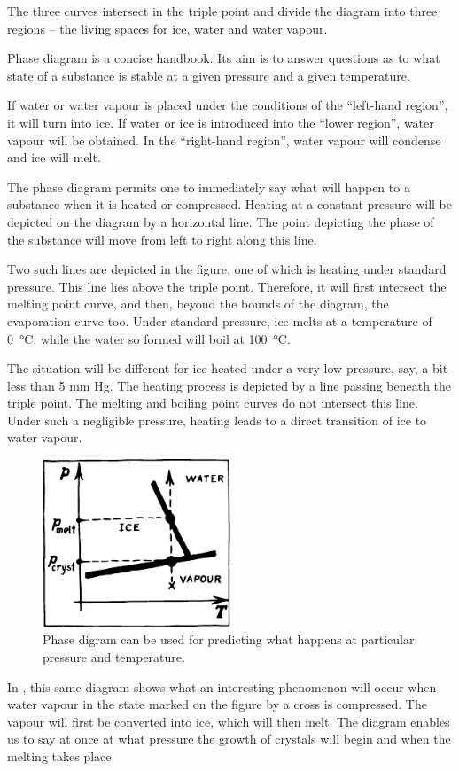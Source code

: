 The three curves intersect in the triple point and divide the diagram into three regions -- the living spaces for ice, water and water vapour.

Phase diagram is a concise handbook. Its aim is to answer questions as to what state of a substance is stable at a given pressure and a given temperature.

If water or water vapour is placed under the conditions of the ``left-hand region'', it will turn into ice. If water or ice is introduced into the ``lower region'', water vapour will be obtained. In the ``right-hand region'', water va­pour will condense and ice will melt.

The phase diagram permits one to immediately say what will happen to a substance when it is heated or compressed. Heating at a constant pressure will be depicted on the diagram by a horizontal line. The point depicting the phase of the substance will move from left to right along this line.

Two such lines are depicted in the figure, one of which is heating under standard pressure. This line lies above the triple point. Therefore, it will first intersect the melting point curve, and then, beyond the bounds of the diagram, the evaporation curve too. Under standard pressure, ice melts at a temperature of \SI{0}{\celsius}, while the water so formed will boil at \SI{100}{\celsius}.

The situation will be different for ice heated under a very low pressure, say, a bit less than 5 mm Hg. The heating process is depicted by a line passing beneath the triple point. The melting and boiling point curves do not intersect this line. Under such a negligible pressure, heating leads to a direct transition of ice to water vapour.

\begin{figure}[!ht]
\centering
\includegraphics[width=0.5\textwidth]{figures/fig-04-12.pdf}
\caption{Phase digram can be used for predicting what happens at particular pressure and temperature.}
\label{fig-4.12}
\end{figure}
In , this same diagram shows what an inter­esting phenomenon will occur when water vapour in the state marked on the figure by a cross is compressed. The vapour will first be converted into ice, which will then melt. The diagram enables us to say at once at what pressure the growth of crystals will begin and when the melting takes place.

